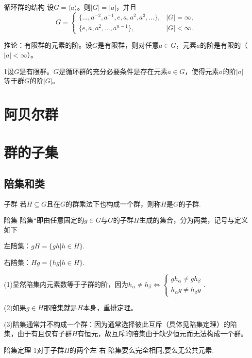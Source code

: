 \documentclass[12pt, openany]{ctexbook} %
\numberwithin{equation}{section} %
\begin{document}
\begin{mytheo}{循环群的结构}
设\(G=\langle a\rangle\)。则\(\vert G\vert=\vert a\vert\)，并且
\[
G=\begin{cases}
\{...,a^{-2},a^{-1},e,a,a^{2},a^{3},...\},&|G|=\infty,\\
\{e,a,a^{2},...,a^{n - 1}\},&|G|<\infty.
\end{cases}
\]
\end{mytheo}

推论：有限群的元素的阶。设\(G\)是有限群，则对任意\(a\in G\)，元素\(a\)的阶是有限的（\(\vert a\vert<\infty\)）。

\begin{mytheo}{}
  1设\(G\)是有限群。\(G\)是循环群的充分必要条件是存在元素\(a\in G\)，使得元素\(a\)的阶\(\vert a\vert\)等于群\(G\)的阶\(\vert G\vert\)。
\end{mytheo}
\section{阿贝尔群}





\section{群的子集}
\subsection{陪集和类}
\begin{mydef}{子群}
若$H\subseteq G$且在$G$的群乘法下也构成一个群，则称$H$是$G$的子群.
\end{mydef}
\begin{mydef}{陪集}
  陪集“即由任意固定的$g\in G$与$G$的子群$H$生成的集合，分为两类，记号与定义如下

左陪集：$gH=\{gh|h\in H\}.$

右陪集：$Hg=\{hg|h\in H\}.$
\end{mydef}

(1)显然陪集内元素数等于子群的阶，因为$h_\alpha\neq h_\beta\Leftrightarrow\begin{cases}gh_\alpha\neq gh_\beta\\h_\alpha g\neq h_\beta g\end{cases}.$

(2)如果$g\in H$那陪集就是$H$本身，重排定理。

(3)陪集通常并不构成一个群：因为通常选择彼此互斥（具体见陪集定理）的陪集，由于有且仅有子群$H$有恒元，故互斥的陪集由于缺少恒元而无法构成一个群。
\begin{mytheo}{陪集定理}
  1对于子群$H$的两个左 右 陪集要么完全相同,要么无公共元素.
\end{mytheo}
\end{document}
